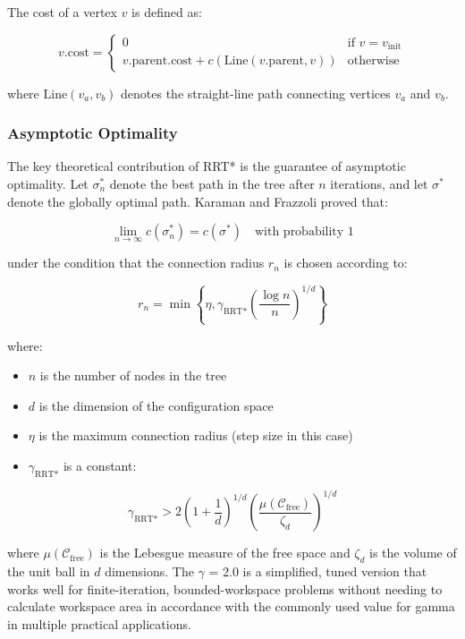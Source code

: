 \documentclass[11pt]{article}
\newcommand{\Cfree}{\mathcal{C}_{\text{free}}}
\newcommand{\vinit}{v_{\text{init}}}
\begin{document}
The cost of a vertex $v$ is defined as:

\begin{equation}
	v.\text{cost} = 
	\begin{cases}
		0 & \text{if } v = \vinit \\
		v.\text{parent}.\text{cost} + c(\text{Line}(v.\text{parent}, v)) & \text{otherwise}
	\end{cases}
\end{equation}

\noindent where $\text{Line}(v_a, v_b)$ denotes the straight-line path connecting vertices $v_a$ and $v_b$.

\subsubsection{Asymptotic Optimality}

The key theoretical contribution of RRT* is the guarantee of asymptotic optimality. Let $\sigma_n^*$ denote the best path in the tree after $n$ iterations, and let $\sigma^*$ denote the globally optimal path. Karaman and Frazzoli proved that:

\begin{equation}
	\lim_{n \to \infty} c(\sigma_n^*) = c(\sigma^*) \quad \text{with probability 1}
\end{equation}

under the condition that the connection radius $r_n$ is chosen according to:

\begin{equation}
	r_n = \min\left\{\eta, \gamma_{\text{RRT*}} \left(\frac{\log n}{n}\right)^{1/d}\right\}
\end{equation}

\noindent where:
\begin{itemize}[noitemsep]
	\item $n$ is the number of nodes in the tree
	\item $d$ is the dimension of the configuration space
	\item $\eta$ is the maximum connection radius (step size in this case)
	\item $\gamma_{\text{RRT*}}$ is a constant:
\end{itemize}

\begin{equation}
	\gamma_{\text{RRT*}} > 2\left(1 + \frac{1}{d}\right)^{1/d}\left(\frac{\mu(\Cfree)}{\zeta_d}\right)^{1/d}
\end{equation}

\noindent where $\mu(\Cfree)$ is the Lebesgue measure of the free space and $\zeta_d$ is the volume of the unit ball in $d$ dimensions. The $\gamma$ = 2.0 is a simplified, tuned version that works well for finite-iteration, bounded-workspace problems
without needing to calculate workspace area in accordance with the commonly used value for gamma in multiple practical applications.
\end{document}
